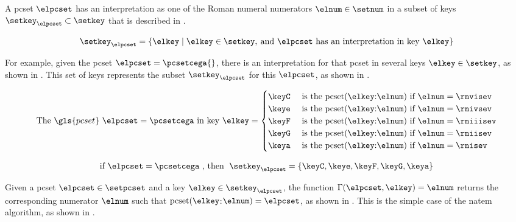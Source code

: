 
A \gls{pcset} $\elpcset$ has an interpretation as one of the
Roman numeral numerators $\elnum \in \setnum$ in a subset of
keys $\setkey_{\elpcset} \subset \setkey$ that is described
in .

\begin{equation}
    \label{eq:keys_for_pcset}
    \setkey_{\elpcset} = \{\elkey \mid \elkey \in \setkey,
     \: \text{and $\elpcset$ has an interpretation in key $\elkey$}\}
\end{equation}

For example, given the \gls{pcset} $\elpcset =
\pcsetcega{}$, there is an interpretation for that
\gls{pcset} in several keys $\elkey \in \setkey$, as shown
in . This set of keys represents the
subset $\setkey_\elpcset$ for this $\elpcset$, as shown in
. 

\begin{equation}
    \label{eq:pcset_cega}
    \text{The } \gls{pcset} \text{ } \elpcset = \pcsetcega \text{ in key } \elkey =
    \begin{cases}
        \keyC & \text{ is the pcset}(\elkey\text{:}\elnum)\text{ if } \elnum = \rnvisev \\
        \keye & \text{ is the pcset}(\elkey\text{:}\elnum)\text{ if } \elnum = \rnivsev \\
        \keyF & \text{ is the pcset}(\elkey\text{:}\elnum)\text{ if } \elnum = \rniiisev \\
        \keyG & \text{ is the pcset}(\elkey\text{:}\elnum)\text{ if } \elnum = \rniisev \\
        \keya & \text{ is the pcset}(\elkey\text{:}\elnum)\text{ if } \elnum = \rnisev \\
    \end{cases}
\end{equation}

\begin{equation}
    \label{eq:keys_for_pcset_example}
    \text{if } \elpcset = \pcsetcega \text{ , then } \; 
    \setkey_{\elpcset} = \{ \keyC, \keye, \keyF, \keyG, \keya \}
\end{equation}

Given a \gls{pcset} $\elpcset \in \setpcset$ and a key
$\elkey \in \setkey_\elpcset$, the function
$\Gamma(\elpcset, \elkey) = \elnum$ returns the
corresponding numerator $\elnum$ such that
$\text{pcset}(\elkey$:$\elnum) = \elpcset$, as shown in
. This is the simple case of
the \gls{natem} algorithm, as shown in . 

